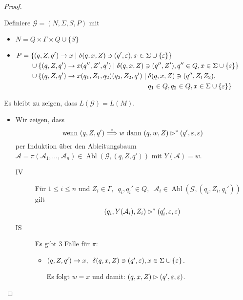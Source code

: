 {\begin{proof}
\begin{itemize}
    Definiere $\mathcal{G} = (N, \Sigma, S, P)$ mit
    \begin{itemize}
    \item $N = Q \times \Gamma \times Q \cup \{S\}$ 
    \item $P =
      \begin{aligned}[t]
        &\{ (q, Z, q') \to x \mid \delta(q, x, Z) \ni (q', \varepsilon), x \in \Sigma \cup \{\varepsilon\} \} \\
        &\cup  \{(q, Z, q') \to x(q'', Z', q') \mid \delta(q, x, Z) \ni (q'', Z'), q'' \in Q, x \in \Sigma \cup \{\varepsilon\}\} \\
        &\cup  \{(q, Z, q') \to x(q_1,Z_1,q_2)(q_2, Z_2, q') \mid 
        \begin{aligned}[t]
          & \delta(q, x, Z) \ni (q'', Z_1Z_2), \\
          & q_1 \in Q, q_2 \in Q, x \in \Sigma \cup \{\varepsilon\} \}
        \end{aligned}
      \end{aligned}$
    \end{itemize}

    Es bleibt zu zeigen, dass $L(\mathcal{G}) = L(M)$.
    \begin{itemize}
    \item Wir zeigen, dass 
      \begin{displaymath}
        \text{wenn }(q,Z,q')\stackrel{*}{\Longrightarrow} w \text{ dann } (q,w,Z) \rhd^* (q',\varepsilon,\varepsilon)
      \end{displaymath}
      per Induktion über den Ableitungsbaum $\mathcal{A}=\pi(\mathcal{A}_1, \ldots, \mathcal{A}_n) \in \operatorname{Abl}(\mathcal{G}, (q,Z,q'))$ mit $Y(\mathcal{A}) = w$.

      \begin{description}
      \item[IV] Für $1 \le i \le n$ und $Z_i \in \Gamma,\enspace q_i,q_i' \in Q,\enspace \mathcal{A}_i \in \operatorname{Abl}(\mathcal{G}, (q_i, Z_i, q_i'))$ gilt
        \begin{displaymath}
          (q_i,Y(\mathcal{A}_i),Z_i) \rhd^* (q_i',\varepsilon,\varepsilon)
        \end{displaymath}
      \item[IS]
        Es gibt $3$ Fälle für $\pi$:
        \begin{itemize}
        \item $(q, Z, q') \to x,\enspace \delta(q, x, Z) \ni (q', \varepsilon), x \in \Sigma \cup \{\varepsilon\}$.

          Es folgt $w = x$ und damit: $(q, x, Z) \rhd (q', \varepsilon, \varepsilon)$.


\end{itemize}
\end{description}
\end{itemize}
\end{itemize}
\end{proof}}
